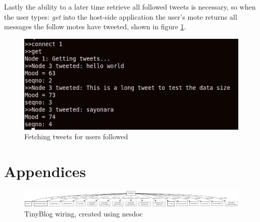 \documentclass{article}
\begin{document}
Lastly the ability to a later time retrieve all followed tweets is necessary, so when the user types: \textit{get} into the host-side application the user's mote returns all messages the follow motes have tweeted, shown in figure \ref{fig:get}.
\begin{figure}[htb!]
\centering
\includegraphics[scale=.6]{img/get.jpg}
\caption{Fetching tweets for users followed}
\label{fig:get}
\end{figure}





\newpage
\section{Appendices}
\begin{figure}[htb!]
\centering
\includegraphics[scale=.27,angle=90]{TinyBlogAppC.png}
\caption{TinyBlog wiring, created using nesdoc}
\label{fig:fullWiring}
\end{figure}
\end{document}

